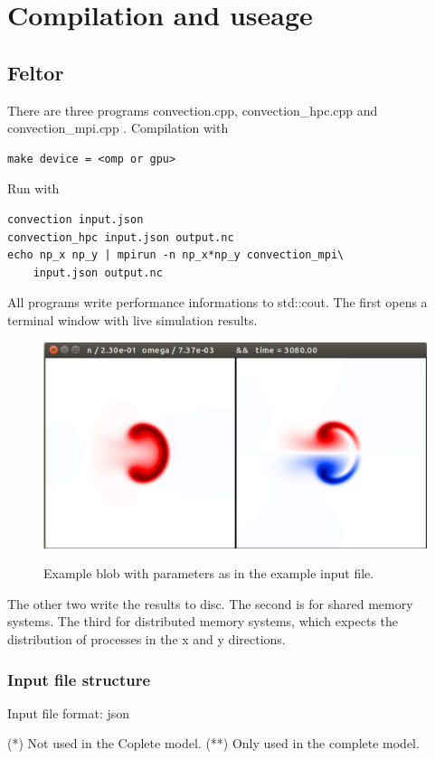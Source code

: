 \documentclass{hitec} %
\begin{document}
\section{Compilation and useage}

\subsection{Feltor}
There are three programs convection.cpp, convection\_hpc.cpp and convection\_mpi.cpp . Compilation with
\begin{verbatim}
make device = <omp or gpu>
\end{verbatim}
Run with
\begin{verbatim}
convection input.json
convection_hpc input.json output.nc
echo np_x np_y | mpirun -n np_x*np_y convection_mpi\
    input.json output.nc
\end{verbatim}
All programs write performance informations to std::cout.
The first opens a terminal window with live simulation results.
\begin{figure}[htpb]
\centering
\includegraphics[trim = 0px 0px 0px 0px, clip, scale=0.4]{./blob}\label{fig:example}
\caption{
  Example blob with parameters as in the example input file.
}
\end{figure}
The other two write the results to disc.
The second is for shared memory systems. The third for distributed
memory systems, which expects the distribution of processes in the
x and y directions.

\subsubsection{Input file structure}
Input file format: json

(*) Not used in the Coplete model.
(**) Only used in the complete model.
\end{document}
